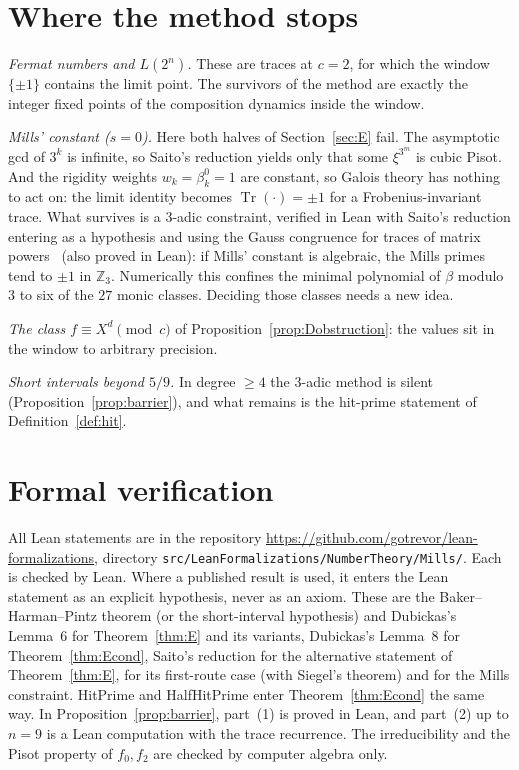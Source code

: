 \documentclass[11pt]{amsart}
\theoremstyle{definition}
\newcommand{\Z}{\mathbb{Z}}
\newcommand{\Tr}{\operatorname{Tr}}
\begin{document}
\section{Where the method stops}\label{sec:limits}

\emph{Fermat numbers and $L(2^n)$.}  These are traces at $c=2$, for which the window $\{\pm1\}$ contains the limit point.  The survivors of the method are exactly the integer fixed points of the composition dynamics inside the window.

\emph{Mills' constant ($s=0$).}  Here both halves of Section~\ref{sec:E} fail.  The asymptotic gcd of $3^k$ is infinite, so Saito's reduction yields only that some $\xi^{3^m}$ is cubic Pisot.  And the rigidity weights $w_k=\beta_k^0=1$ are constant, so Galois theory has nothing to act on: the limit identity becomes $\Tr(\cdot)=\pm1$ for a Frobenius-invariant trace.  What survives is a $3$-adic constraint, verified in Lean with Saito's reduction entering as a hypothesis and using the Gauss congruence for traces of matrix powers~\cite{Ste17} (also proved in Lean): if Mills' constant is algebraic, the Mills primes tend to $\pm1$ in $\Z_3$.  Numerically this confines the minimal polynomial of $\beta$ modulo $3$ to six of the $27$ monic classes.  Deciding those classes needs a new idea.

\emph{The class $f\equiv X^d\pmod c$} of Proposition~\ref{prop:Dobstruction}: the values sit in the window to arbitrary precision.

\emph{Short intervals beyond $5/9$.}  In degree $\ge4$ the $3$-adic method is silent (Proposition~\ref{prop:barrier}), and what remains is the hit-prime statement of Definition~\ref{def:hit}.

\section{Formal verification}\label{sec:lean}

All Lean statements are in the repository \url{https://github.com/gotrevor/lean-formalizations}, directory \texttt{src/LeanFormalizations/NumberTheory/Mills/}.  Each is checked by Lean.  Where a published result is used, it enters the Lean statement as an explicit hypothesis, never as an axiom.  These are the Baker--Harman--Pintz theorem (or the short-interval hypothesis) and Dubickas's Lemma~6 for Theorem~\ref{thm:E} and its variants, Dubickas's Lemma~8 for Theorem~\ref{thm:Econd}, Saito's reduction for the alternative statement of Theorem~\ref{thm:E}, for its first-route case (with Siegel's theorem) and for the Mills constraint.  HitPrime and HalfHitPrime enter Theorem~\ref{thm:Econd} the same way.  In Proposition~\ref{prop:barrier}, part~(1) is proved in Lean, and part~(2) up to $n=9$ is a Lean computation with the trace recurrence.  The irreducibility and the Pisot property of $f_0,f_2$ are checked by computer algebra only.
\end{document}
